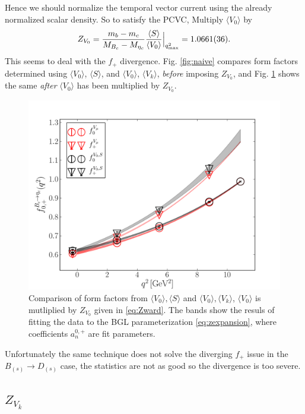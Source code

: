 Hence we should normalize the temporal vector current using the already normalized scalar density. So to satisfy the PCVC, Multiply $\langle V_0 \rangle$ by 
\begin{align}
	Z_{V_0} = {m_b-m_c \over M_{B_c}-M_{\eta_c} } { \langle S \rangle \over \langle V_0 \rangle }\Big\vert_{q^2_{\text{max}}} = 1.0661(36).
	\label{eq:Zward}
\end{align}
This seems to deal with the $f_+$ divergence. Fig. \ref{fig:naive} compares form factors determined using $\langle V_0 \rangle$, $\langle S \rangle$, and $\langle V_0 \rangle$, $\langle V_k \rangle$, {\textit{before}} imposing $Z_{V_0}$, and Fig. \ref{fig:Zward} shows the same {\textit{after}} $\langle V_0 \rangle$ has been multiplied by $Z_{V_0}$.
\begin{figure}[htb!]
\centering
\includegraphics[scale=0.55]{images/nrqcd/Bcetac_bothways_2.pdf}
\caption{Comparison of form factors from $\langle V_0 \rangle,\langle S \rangle $ and $\langle V_0\rangle,\langle V_k\rangle$, $\langle V_0\rangle$ is mutliplied by $Z_{V_0}$ given in \eqref{eq:Zward}. The bands show the resuls of fitting the data to the BGL parameterization \eqref{eq:zexpansion}, where coefficients $a^{0,+}_n$ are fit parameters. \label{fig:Zward}}
\end{figure}
Unfortunately the same technique does not solve the diverging $f_+$ issue in the $B_{(s)}\to D_{(s)}$ case, the statistics are not as good so the divergence is too severe. 

\subsection{$Z_{V_k}$}
\label{sec:ZVk}

